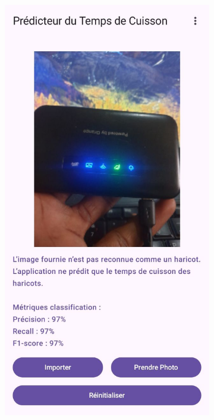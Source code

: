 \begin{figure}[H]
    \centering

    \begin{subfigure}{0.2\textwidth}
        \centering
        \includegraphics[width=\linewidth]{figures/test4.jpg}

\end{subfigure}
\end{figure}
